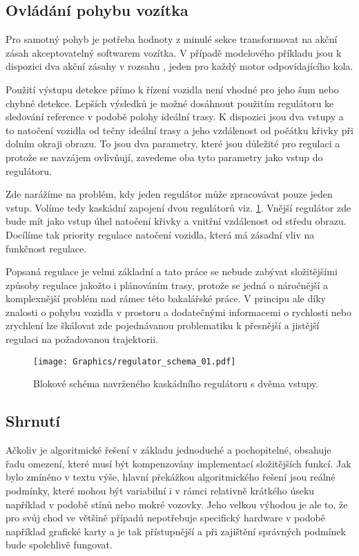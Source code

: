 \documentclass[czech, bc, kky, he, iso690numb]{fasthesis}
\begin{document}
            \subsection{Ovládání pohybu vozítka}
            	Pro samotný pohyb je potřeba hodnoty z minulé sekce transformovat na akční zásah akceptovatelný softwarem vozítka. V případě modelového příkladu jsou k dispozici dva akční zásahy v rozsahu \(<-1,1>\), jeden pro každý motor odpovídajícího kola.
            	
                Použití výstupu detekce přímo k řízení vozidla není vhodné pro jeho šum nebo chybné detekce. Lepších výsledků je možné dosáhnout použitím regulátoru ke sledování reference v podobě polohy ideální trasy. K dispozici jsou dva vstupy a to natočení vozidla od tečny ideální trasy a jeho vzdálenost od počátku křivky při dolním okraji obrazu. To jsou dva parametry, které jsou důležité pro regulaci a protože se navzájem ovlivňují, zavedeme oba tyto parametry jako vstup do regulátoru.
                
                Zde narážíme na problém, kdy jeden regulátor může zpracovávat pouze jeden vstup. Volíme tedy kaskádní zapojení dvou regulátorů viz. \ref{pic:regulator_schema}. Vnější regulátor zde bude mít jako vstup úhel natočení křivky a vnitřní vzdálenost od středu obrazu. Docílíme tak priority regulace natočení vozidla, která má zásadní vliv na funkčnost regulace.
                
                Popsaná regulace je velmi základní a tato práce se nebude zabývat složitějšími způsoby regulace jakožto i plánováním trasy, protože se jedná o náročnější a komplexnější problém nad rámec této bakalářské práce. V principu ale díky znalosti o pohybu vozidla v prostoru a dodatečnými informacemi o rychlosti nebo zrychlení lze škálovat zde pojednávanou problematiku k přesnější a jistější regulaci na požadovanou trajektorii.
                
                \begin{figure}[h]
                	\centering
                	\texttt{[image: Graphics/regulator\_schema\_01.pdf]}
                	\caption{Blokové schéma navrženého kaskádního regulátoru s dvěma vstupy.}
                	\label{pic:regulator_schema}
                \end{figure}
            \subsection{Shrnutí}
            	Ačkoliv je algoritmické řešení v základu jednoduché a pochopitelné, obsahuje řadu omezení, které musí být kompenzovány implementací složitějších funkcí. Jak bylo zmíněno v textu výše, hlavní překážkou algoritmického řešení jsou reálné podmínky, které mohou být variabilní i v rámci relativně krátkého úseku například v podobě stínů nebo mokré vozovky. Jeho velkou výhodou je ale to, že pro svůj chod ve většině případů nepotřebuje specifický hardware v podobě například grafické karty a je tak přístupnější a při zajištění správných podmínek bude spolehlivě fungovat. 
            
\end{document}
